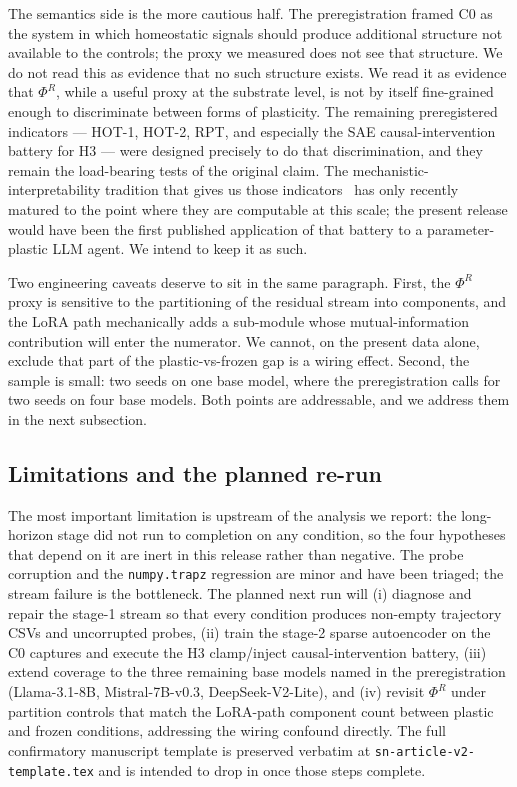 \documentclass[pdflatex,sn-mathphys-num]{sn-jnl}
\theoremstyle{thmstyleone}
\theoremstyle{thmstylethree}
\begin{document}
The semantics side is the more cautious half. The preregistration framed C0 as the system in which homeostatic signals should produce additional structure not available to the controls; the proxy we measured does not see that structure. We do not read this as evidence that no such structure exists. We read it as evidence that $\Phi^R$, while a useful proxy at the substrate level, is not by itself fine-grained enough to discriminate between forms of plasticity. The remaining preregistered indicators --- HOT-1, HOT-2, RPT, and especially the SAE causal-intervention battery for H3 --- were designed precisely to do that discrimination, and they remain the load-bearing tests of the original claim. The mechanistic-interpretability tradition that gives us those indicators~\cite{templeton2024scaling} has only recently matured to the point where they are computable at this scale; the present release would have been the first published application of that battery to a parameter-plastic LLM agent. We intend to keep it as such.

Two engineering caveats deserve to sit in the same paragraph. First, the $\Phi^R$ proxy is sensitive to the partitioning of the residual stream into components, and the LoRA path mechanically adds a sub-module whose mutual-information contribution will enter the numerator. We cannot, on the present data alone, exclude that part of the plastic-vs-frozen gap is a wiring effect. Second, the sample is small: two seeds on one base model, where the preregistration calls for two seeds on four base models. Both points are addressable, and we address them in the next subsection.

\subsection*{Limitations and the planned re-run}

The most important limitation is upstream of the analysis we report: the long-horizon stage did not run to completion on any condition, so the four hypotheses that depend on it are inert in this release rather than negative. The probe corruption and the \texttt{numpy.trapz} regression are minor and have been triaged; the stream failure is the bottleneck. The planned next run will (i) diagnose and repair the stage-1 stream so that every condition produces non-empty trajectory CSVs and uncorrupted probes, (ii) train the stage-2 sparse autoencoder on the C0 captures and execute the H3 clamp/inject causal-intervention battery, (iii) extend coverage to the three remaining base models named in the preregistration (Llama-3.1-8B, Mistral-7B-v0.3, DeepSeek-V2-Lite), and (iv) revisit $\Phi^R$ under partition controls that match the LoRA-path component count between plastic and frozen conditions, addressing the wiring confound directly. The full confirmatory manuscript template is preserved verbatim at \texttt{sn-article-v2-template.tex} and is intended to drop in once those steps complete.
\end{document}
